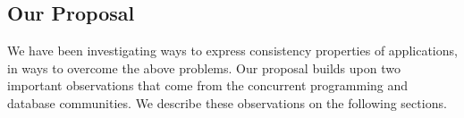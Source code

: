 

\subsection{Our Proposal}
We have been investigating ways to express consistency properties of
applications, in ways to overcome the above problems. Our proposal builds upon
two important observations that come from the concurrent programming and
database communities. We describe these observations on the following sections.  

